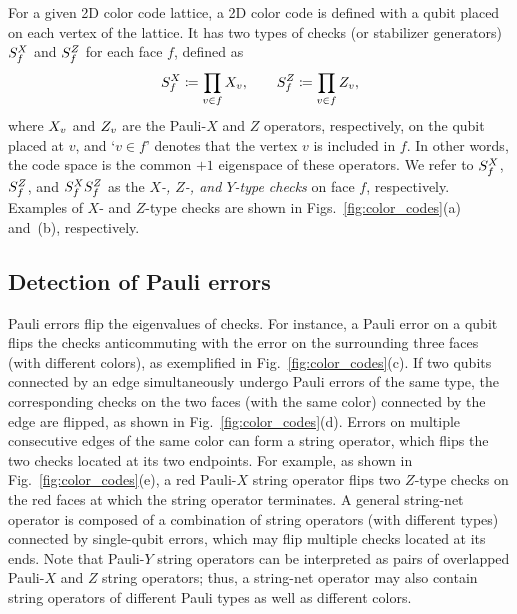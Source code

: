 \documentclass[
 prx,
 reprint,
 superscriptaddress,
 longbibliography,
 dvipsnames
]{revtex4-2}
\begin{document}
For a given 2D color code lattice, a 2D color code is defined with a qubit placed on each vertex of the lattice. 
It has two types of checks (or stabilizer generators) $S_{f}^X$ and $S_{f}^Z$ for each face $f$, defined as
\begin{align*}
    S_{f}^X \coloneqq \prod_{v \in f} X_{v}, \qquad S_{f}^Z \coloneqq \prod_{v \in f} Z_{v},
\end{align*}
where $X_{v}$ and $Z_{v}$ are the Pauli-$X$ and $Z$ operators, respectively, on the qubit placed at $v$, and `$v \in f$' denotes that the vertex $v$ is included in $f$. 
In other words, the code space is the common $+1$ eigenspace of these operators. 
We refer to $S_{f}^X$, $S_{f}^Z$, and $S_{f}^XS_{f}^Z$ as the \textit{$X$-, $Z$-, and $Y$-type checks} on face $f$, respectively. 
Examples of $X$- and $Z$-type checks are shown in Figs.~\ref{fig:color_codes}(a) and~(b), respectively. 

\subsection{Detection of Pauli errors \label{subsec:error_detection}}

Pauli errors flip the eigenvalues of checks.
For instance, a Pauli error on a qubit flips the checks anticommuting with the error on the surrounding three faces (with different colors), as exemplified in Fig.~\ref{fig:color_codes}(c).
If two qubits connected by an edge simultaneously undergo Pauli errors of the same type, the corresponding checks on the two faces (with the same color) connected by the edge are flipped, as shown in Fig.~\ref{fig:color_codes}(d).
Errors on multiple consecutive edges of the same color can form a string operator, which flips the two checks located at its two endpoints.
For example, as shown in Fig.~\ref{fig:color_codes}(e), a red Pauli-$X$ string operator flips two $Z$-type checks on the red faces at which the string operator terminates.
A general string-net operator is composed of a combination of string operators (with different types) connected by single-qubit errors, which may flip multiple checks located at its ends.
Note that Pauli-$Y$ string operators can be interpreted as pairs of overlapped Pauli-$X$ and $Z$ string operators; thus, a string-net operator may also contain string operators of different Pauli types as well as different colors.
\end{document}
